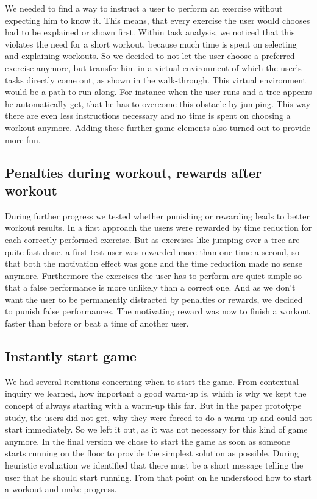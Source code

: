 \documentclass{sigchi}
\begin{document}
    We needed to find a way to instruct a user to perform an exercise without expecting him to know it. This means, that every exercise the user would chooses had to be explained or shown first. Within task analysis, we noticed that this violates the need for a short workout, because much time is spent on selecting and explaining workouts. So we decided to not let the user choose a preferred exercise anymore, but transfer him in a virtual environment of which the user's tasks directly come out, as shown in the walk-through. This virtual environment would be a path to run along. For instance when the user runs and a tree appears he automatically get, that he has to overcome this obstacle by jumping. This way there are even less instructions necessary and no time is spent on choosing a workout anymore. Adding these further game elements also turned out to provide more fun.

  \subsection{Penalties during workout, rewards after workout} %
  \label{sub:penalties_during_workout_rewards_after_workout}

    During further progress we tested whether punishing or rewarding leads to better workout results. In a first approach the users were rewarded by time reduction for each correctly performed exercise. But as exercises like jumping over a tree are quite fast done, a first test user was rewarded more than one time a second, so that both the motivation effect was gone and the time reduction made no sense anymore. Furthermore the exercises the user has to perform are quiet simple so that a false performance is more unlikely than a correct one. And as we don't want the user to be permanently distracted by penalties or rewards, we decided to punish false performances. The motivating reward was now to finish a workout faster than before or beat a time of another user.

  \subsection{Instantly start game } %
  \label{sub:instantly_start_game_}

    We had several iterations concerning when to start the game. From contextual inquiry we learned, how important a good warm-up is, which is why we kept the concept of always starting with a warm-up this far. But in the paper prototype study, the users did not get, why they were forced to do a warm-up and could not start immediately. So we left it out, as it was not necessary for this kind of game anymore. In the final version we chose to start the game as soon as someone starts running on the floor to provide the simplest solution as possible. During heuristic evaluation we identified that there must be a short message telling the user that he should start running. From that point on he understood how to start a workout and make progress.
\end{document}
